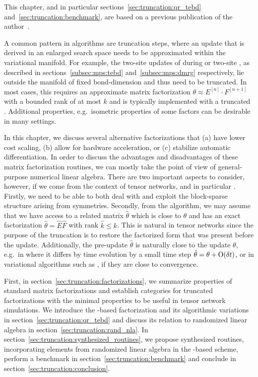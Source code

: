 This chapter, and in particular sections~\ref{sec:truncation:qr_tebd} and~\ref{sec:truncation:benchmark}, are based on a previous publication of the author~\cite{unfried2023}.

A common pattern in  algorithms are truncation steps, where an update that is derived in an enlarged search space needs to be approximated within the variational manifold.
%
For example, the two-site updates of  during  or two-site , as described in sections~\ref{subsec:mps:tebd} and~\ref{subsec:mps:dmrg} respectively, lie outside the manifold of fixed bond-dimension  and thus need to be truncated.
%
In most cases, this requires an approximate matrix factorization $\theta \approx E^{[n]} \cdot F^{[n+1]}$ with a bounded rank of at most $k$ and is typically implemented with a truncated .
%
Additional properties, e.g.~isometric properties of some factors can be desirable in many settings.


In this chapter, we discuss several alternative factorizations that (a) have lower cost scaling, (b) allow for hardware acceleration, or (c) stabilize automatic differentiation.
%
In order to discuss the advantages and disadvantages of these matrix factorization routines, we can mostly take the point of view of general-purpose numerical linear algebra.
%
There are two important aspects to consider, however, if we come from the context of tensor networks, and in particular .
%
Firstly, we need to be able to both deal with and exploit the block-sparse structure arising from symmetries.
%
Secondly, from the  algorithm, we may assume that we have access to a related matrix $\hat\theta$ which is close to $\theta$ and has an exact factorization $\hat\theta = \hat E \hat F$ with rank $\hat k \leq k$.
%
This is natural in tensor networks since the purpose of the truncation is to restore the factorized  form that was present before the update.
%
Additionally, the pre-update $\hat\theta$ is naturally close to the update $\theta$, e.g.~in  where it differs by time evolution by a small time step $\hat\theta = \theta + \mathrm{O}(\delta t)$, or in variational algorithms such as , if they are close to convergence.

First, in section~\ref{sec:truncation:factorizations}, we summarize properties of standard matrix factorizations and establish categories for truncated factorizations with the minimal properties to be useful in tensor network simulations. 
%
We introduce the -based factorization and its algorithmic variations in section~\ref{sec:truncation:qr_tebd} and discuss its relation to randomized linear algebra in section~\ref{sec:truncation:rand_nla}.
%
In section~\ref{sec:truncation:synthesized_routines}, we propose synthesized routines, incorporating elements from randomized linear algebra in the -based scheme, perform a benchmark in section~\ref{sec:truncation:benchmark} and conclude in section~\ref{sec:truncation:conclusion}.
